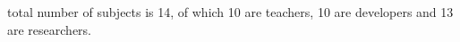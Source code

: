 total number of subjects is 14, 
of which 10 are teachers, 
10 are developers and 
13 are researchers.
